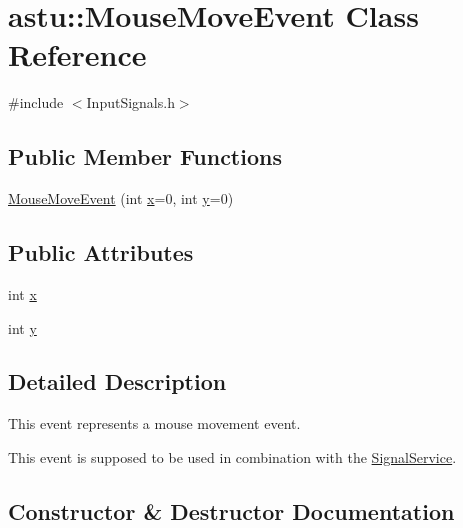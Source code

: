 \hypertarget{classastu_1_1MouseMoveEvent}{}\section{astu\+:\+:Mouse\+Move\+Event Class Reference}
\label{classastu_1_1MouseMoveEvent}


{\ttfamily \#include $<$Input\+Signals.\+h$>$}

\subsection*{Public Member Functions}
\begin{DoxyCompactItemize}
\item 
\hyperlink{classastu_1_1MouseMoveEvent_a97793ce6e2851052a88ec8191e8678dd}{Mouse\+Move\+Event} (int \hyperlink{classastu_1_1MouseMoveEvent_aad28f3b8b9414a7620094bb0d9d1b721}{x}=0, int \hyperlink{classastu_1_1MouseMoveEvent_aa058136ad49cd96594c7dc7b7b629c73}{y}=0)
\end{DoxyCompactItemize}
\subsection*{Public Attributes}
\begin{DoxyCompactItemize}
\item 
int \hyperlink{classastu_1_1MouseMoveEvent_aad28f3b8b9414a7620094bb0d9d1b721}{x}
\item 
int \hyperlink{classastu_1_1MouseMoveEvent_aa058136ad49cd96594c7dc7b7b629c73}{y}
\end{DoxyCompactItemize}


\subsection{Detailed Description}
This event represents a mouse movement event.

This event is supposed to be used in combination with the \hyperlink{classastu_1_1SignalService}{Signal\+Service}. 

\subsection{Constructor \& Destructor Documentation}
\mbox{\label{classastu_1_1MouseMoveEvent_a97793ce6e2851052a88ec8191e8678dd}} 
